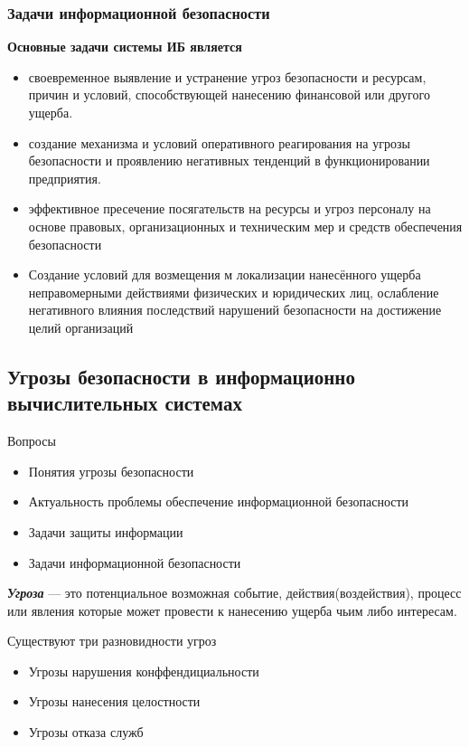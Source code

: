 \documentclass[a4paper,12pt]{extarticle}
\begin{document}
	\subsubsection{Задачи информационной безопасности}
	\textbf{Основные задачи системы ИБ является}
	\begin{itemize}
		\item своевременное выявление и устранение угроз безопасности и ресурсам, причин и условий, способствующей нанесению финансовой или другого ущерба.
		\item создание механизма и условий оперативного реагирования на угрозы безопасности и проявлению негативных тенденций в функционировании предприятия.
		\item эффективное пресечение посягательств на ресурсы и угроз персоналу на основе правовых, организационных и техническим мер и средств обеспечения безопасности
		\item Создание условий для возмещения м локализации нанесённого ущерба неправомерными действиями физических и юридических лиц, ослабление негативного влияния последствий нарушений безопасности на достижение целий организаций
	\end{itemize}
	
	\newpage
	\subsection{Угрозы безопасности в информационно вычислительных системах}
	Вопросы
	\begin{itemize}
		\item Понятия угрозы безопасности
		\item Актуальность проблемы обеспечение информационной безопасности
		\item Задачи защиты информации
		\item Задачи информационной безопасности
	\end{itemize}
	
	\textit{\textbf{Угроза}} --- это потенциальное возможная событие, действия(воздействия), процесс или явления которые может провести к нанесению ущерба чьим либо интересам.
	
	Существуют три разновидности угроз
	\begin{itemize}
		\item Угрозы нарушения конффендициальности
		\item Угрозы нанесения целостности
		\item Угрозы отказа служб
	\end{itemize}
	
\end{document}

